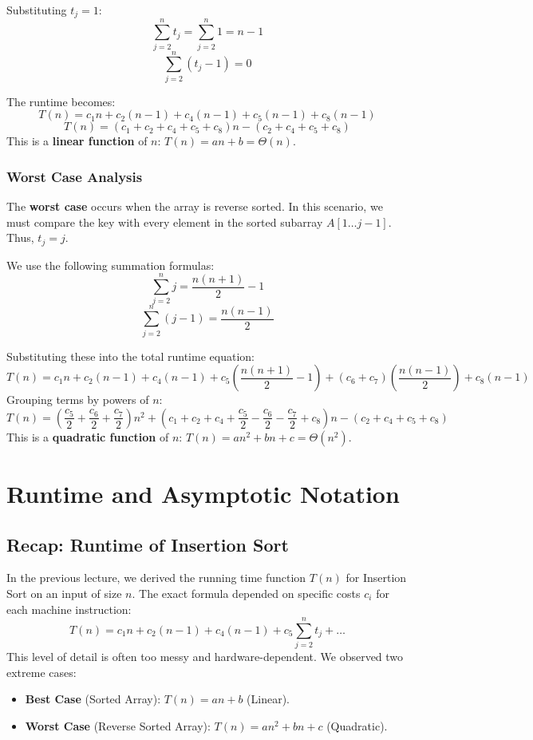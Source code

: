 \documentclass[12pt]{article}
\theoremstyle{blueplain}
\theoremstyle{bluedef}
\theoremstyle{blueremark}
\begin{document}
Substituting $t_j = 1$:
\[ \sum_{j=2}^n t_j = \sum_{j=2}^n 1 = n-1 \]
\[ \sum_{j=2}^n (t_j - 1) = 0 \]

The runtime becomes:
\[
    T(n) = c_1 n + c_2 (n-1) + c_4 (n-1) + c_5 (n-1) + c_8 (n-1)
\]
\[
    T(n) = (c_1 + c_2 + c_4 + c_5 + c_8)n - (c_2 + c_4 + c_5 + c_8)
\]
This is a \textbf{linear function} of $n$: $T(n) = an + b = \Theta(n)$.

\subsubsection{Worst Case Analysis}
The \textbf{worst case} occurs when the array is reverse sorted.
In this scenario, we must compare the key with every element in the sorted subarray $A[1 \dots j-1]$. Thus, $t_j = j$.

We use the following summation formulas:
\[ \sum_{j=2}^n j = \frac{n(n+1)}{2} - 1 \]
\[ \sum_{j=2}^n (j-1) = \frac{n(n-1)}{2} \]

Substituting these into the total runtime equation:
\[
    T(n) = c_1 n + c_2(n-1) + c_4(n-1) + c_5\left(\frac{n(n+1)}{2} - 1\right) + (c_6 + c_7)\left(\frac{n(n-1)}{2}\right) + c_8(n-1)
\]
Grouping terms by powers of $n$:
\[
    T(n) = \left(\frac{c_5}{2} + \frac{c_6}{2} + \frac{c_7}{2}\right)n^2 + \left(c_1 + c_2 + c_4 + \frac{c_5}{2} - \frac{c_6}{2} - \frac{c_7}{2} + c_8\right)n - (c_2 + c_4 + c_5 + c_8)
\]
This is a \textbf{quadratic function} of $n$: $T(n) = an^2 + bn + c = \Theta(n^2)$.

\clearpage


\section{Runtime and Asymptotic Notation}

\subsection{Recap: Runtime of Insertion Sort}

In the previous lecture, we derived the running time function $T(n)$ for Insertion Sort on an input of size $n$. The exact formula depended on specific costs $c_i$ for each machine instruction:
\[
    T(n) = c_1 n + c_2(n-1) + c_4(n-1) + c_5 \sum_{j=2}^n t_j + \dots
\]
This level of detail is often too messy and hardware-dependent. We observed two extreme cases:
\begin{itemize}
    \item \textbf{Best Case} (Sorted Array): $T(n) = an + b$ (Linear).
    \item \textbf{Worst Case} (Reverse Sorted Array): $T(n) = an^2 + bn + c$ (Quadratic).
\end{itemize}
\end{document}
